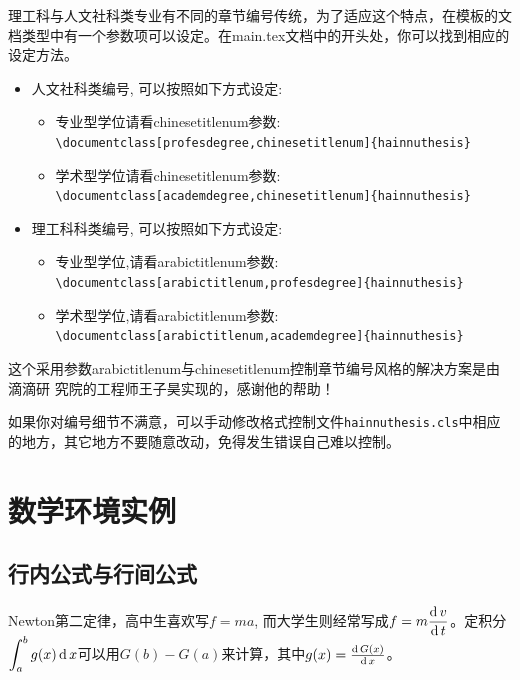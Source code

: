 理工科与人文社科类专业有不同的章节编号传统，为了适应这个特点，在模板的文档类型中有一个参数项可以设定。在main.tex文档中的开头处，你可以找到相应的设定方法。
\begin{itemize}
\item 人文社科类编号, 可以按照如下方式设定:
     \begin{itemize}
     \item 专业型学位请看chinesetitlenum参数: \\
     \verb|\documentclass[profesdegree,chinesetitlenum]{hainnuthesis}|
     \item 学术型学位请看chinesetitlenum参数: \\
     \verb|\documentclass[academdegree,chinesetitlenum]{hainnuthesis}|
     \end{itemize}
\item 理工科科类编号, 可以按照如下方式设定:
     \begin{itemize}
     \item 专业型学位,请看arabictitlenum参数: \\
     \verb|\documentclass[arabictitlenum,profesdegree]{hainnuthesis}|
     \item 学术型学位,请看arabictitlenum参数:\\
      \verb|\documentclass[arabictitlenum,academdegree]{hainnuthesis}|
     \end{itemize}
\end{itemize}
这个采用参数arabictitlenum与chinesetitlenum控制章节编号风格的解决方案是由滴滴研
究院的工程师王子昊实现的，感谢他的帮助！

如果你对编号细节不满意，可以手动修改格式控制文件\verb|hainnuthesis.cls|中相应的地方，其它地方不要随意改动，免得发生错误自己难以控制。




\section{数学环境实例}

\subsection{行内公式与行间公式}

Newton第二定律，高中生喜欢写$f=ma$, 而大学生则经常写成$\displaystyle{f=m\frac{\operatorname{\mathrm{d}}{v}}{\operatorname{\mathrm{d}}{t}}}$。定积分
$\displaystyle{\int^b_a g(x)\operatorname{\mathrm{d}}x}$可以用$G(b)-G(a)$来计算，其中$g(x) = \frac{\operatorname{\mathrm{d}} {G(x)}}{\operatorname{\mathrm{d}} {x}}$。

